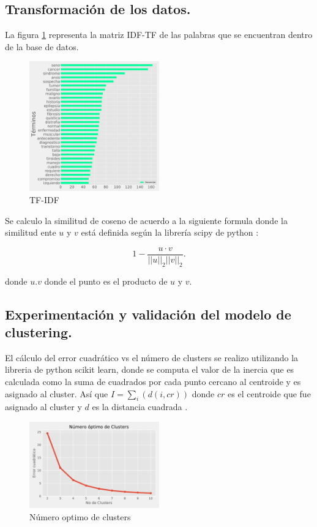 \subsection{Transformación de los datos.}

La figura \ref{fig:IDFTF} representa la matriz IDF-TF de las palabras que se encuentran dentro de la base de datos.  

\begin{figure}[H] 
	\centering
	\includegraphics[width=0.5\textwidth]{Kap4/tfidf.pdf}
	\caption{TF-IDF} 
	\label{fig:IDFTF}
\end{figure}

Se calculo la similitud de coseno de acuerdo a la siguiente formula donde la similitud ente $u$  y $v$ está definida según la librería scipy de python \cite{scipy}:

$$   1 - \frac{u \cdot v}
{||u||_2 ||v||_2}. $$

donde $u.v$ donde el punto es el producto de $u$ y $v$.

\subsection{Experimentación y validación del modelo de clustering.}

  

El cálculo del error cuadrático vs el número de clusters se realizo utilizando la libreria de python scikit learn, donde se computa el valor de la inercia que es calculada como la suma de cuadrados por cada punto cercano al centroide y es asignado al cluster. Así que  $I = \sum_{i}(d(i,cr))$ donde $cr$ es el centroide que fue asignado al cluster y $d$ es la distancia cuadrada \cite{scikit-learn}. 

\begin{figure}[H] 
	\centering
	\includegraphics[width=0.5\textwidth]{Kap4/Clusters}
	\caption{Número optimo de clusters} 
	\label{fig:Clusters}
\end{figure}

